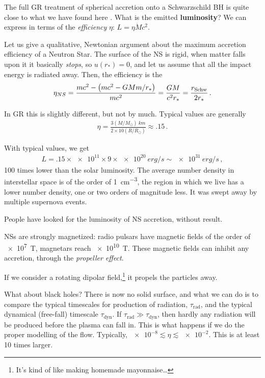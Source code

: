 \documentclass[main.tex]{subfiles}
\begin{document}
The full GR treatment of spherical accretion onto a Schwarzschild BH is quite close to what we have found here \cite[fig.\ 2, top left]{nobiliSphericalAccretionBlack1991}. 
What is the emitted \textbf{luminosity}? We can express in terms of the \emph{efficiency} \(\eta \): \(L = \eta \dot{M} c^2\). 

Let us give a qualitative, Newtonian argument about the maximum accretion efficiency of a Neutron Star. 
The surface of the NS is rigid, when matter falls upon it it basically \emph{stops}, so \(u(r_*) = 0\), and let us assume that all the impact energy is radiated away.
Then, the efficiency is the 
%
\begin{align}
\eta_{NS} = \frac{mc^2 - \qty( mc^2 -GMm / r_*)}{mc^2}=  \frac{GM}{c^2 r_*} = \frac{r _{\text{Schw}}}{2 r_*}
\,.
\end{align}

In GR this is slightly different, but not by much. 
Typical values are generally 
%
\begin{align}
\eta = \frac{3 (M / M _{\odot}) \SI{}{km}}{2 \times 10 (R / R _{\odot})} \approx \num{.15}
\,.
\end{align}

With typical values, we get 
%
\begin{align}
L = \num{.15} \times \num{e11} \times 9 \times \num{e20} \SI{}{erg/s} \sim \SI{e31}{erg/s}
\,,
\end{align}
%
100 times lower than the solar luminosity.
The average number density in interstellar space is of the order of \SI{1}{cm^{-3}}, the region in which we live has a lower number density, one or two orders of magnitude less.
It was swept away by multiple supernova events. 

People have looked for the luminosity of NS accretion, without result. 

NSs are strongly magnetized: radio pulsars have magnetic fields of the order of \SI{e7}{T}, magnetars reach \SI{e10}{T}. 
These magnetic fields can inhibit any accretion, through the \emph{propeller effect}.

If we consider a rotating dipolar field,\footnote{It's kind of like making homemade mayonnaise\dots} it propels the particles away. 

What about black holes? There is now no solid surface, and what we can do is to compare the typical timescales for production of radiation, \(\tau _{\text{rad}}\), and the typical dynamical (free-fall) timescale \(\tau _{\text{dyn}}\). If \(\tau _{\text{rad}} \gg \tau _{\text{dyn}}\), then hardly any radiation will be produced before the plasma can fall in. 
This is what happens if we do the proper modelling of the flow. 
Typically, \(\num{e-8} \lesssim \eta \lesssim \num{e-2}\). This is at least 10 times larger. 
\end{document}
